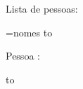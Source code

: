\documentclass{article}
\begin{document}
\setcounter{pessoas}{1}

Lista de pessoas: 

\newread\file
\openin\file=nomes
\read\file to\fileline %

\loop\unless\ifeof\file
    Pessoa \thepessoas: \fileline

    \addtocounter{pessoas}{1}
    \read\file to\fileline %
\repeat
\closein\file
\end{document}
